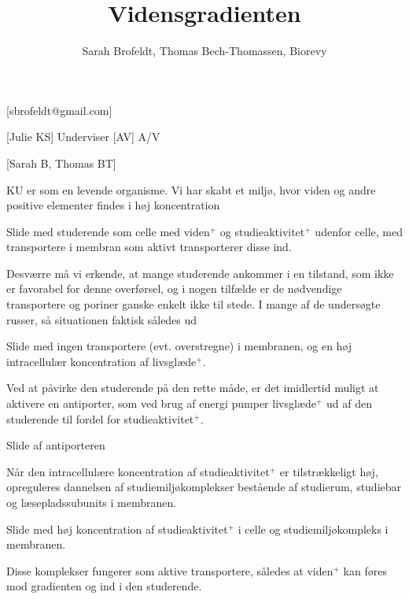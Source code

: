 \documentclass[a4paper,12pt]{article}
\title{Vidensgradienten}
\author{Sarah Brofeldt, Thomas Bech-Thomassen, Biorevy}
\begin{document}
\maketitle

\begin{texxers}
	[sbrofeldt@gmail.com]
\end{texxers}

\begin{roles}
	[Julie KS] Underviser
	[AV] A/V
\end{roles}


\begin{props}
	[Sarah B, Thomas BT] 
\end{props}

\begin{sketch}


 KU er som en levende organisme. Vi har skabt et miljø, hvor viden og andre positive elementer findes i høj koncentration

 Slide med studerende som celle med viden$^+$ og studieaktivitet$^+$ udenfor celle, med transportere i membran som aktivt transporterer disse ind.

 Desværre må vi erkende, at mange studerende ankommer i en tilstand, som ikke er favorabel for denne overførsel, og i nogen tilfælde er de nødvendige transportere og poriner ganske enkelt ikke til stede. I mange af de undersøgte russer, så situationen faktisk således ud

 Slide med ingen transportere (evt. overstregne) i membranen, og en høj intracellulær koncentration af livsglæde$^+$.

 Ved at påvirke den studerende på den rette måde, er det imidlertid muligt at aktivere en antiporter, som ved brug af energi pumper livsglæde$^+$ ud af den studerende til fordel for studieaktivitet$^+$.

 Slide af antiporteren

 Når den intracellulære koncentration af studieaktivitet$^+$ er tilstrækkeligt høj, opreguleres dannelsen af studiemiljøkomplekser bestående af studierum, studiebar og læsepladssubunits i membranen.

 Slide med høj koncentration af studieaktivitet$^+$ i celle og studiemiljøkompleks i membranen.

 Disse komplekser fungerer som aktive transportere, således at viden$^+$ kan føres mod gradienten og ind i den studerende. 


\end{sketch}
\end{document}

